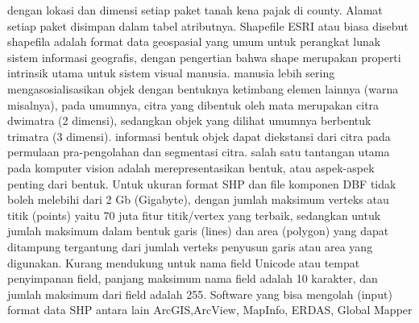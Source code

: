 dengan lokasi dan dimensi setiap paket tanah kena pajak di county. Alamat setiap paket disimpan dalam tabel atributnya.
Shapefile ESRI atau biasa disebut shapefila adalah format data geospasial yang umum untuk perangkat lunak sistem informasi geografis, dengan pengertian bahwa shape merupakan properti intrinsik utama untuk sistem visual manusia. manusia lebih sering mengasosialisasikan objek dengan bentuknya ketimbang elemen lainnya (warna misalnya), pada umumnya, citra yang dibentuk oleh mata merupakan citra dwimatra (2 dimensi), sedangkan objek yang dilihat umumnya berbentuk trimatra (3 dimensi). informasi bentuk objek dapat diekstansi dari citra pada permulaan pra-pengolahan dan segmentasi citra. salah satu tantangan utama pada komputer vision adalah merepresentasikan bentuk, atau aspek-aspek penting dari bentuk.
Untuk ukuran format SHP dan file komponen DBF tidak boleh melebihi dari 2 Gb (Gigabyte), 
dengan jumlah maksimum verteks atau titik (points) yaitu 70 juta fitur titik/vertex yang terbaik, 
sedangkan untuk jumlah maksimum dalam bentuk garis (lines) dan area (polygon) yang dapat ditampung tergantung dari jumlah verteks penyusun garis atau area yang digunakan. 
Kurang mendukung untuk nama field Unicode atau tempat penyimpanan field, panjang maksimum nama field adalah 10 karakter, 
dan jumlah maksimum dari field adalah 255.
Software yang bisa mengolah (input) format data SHP antara lain ArcGIS,ArcView, MapInfo, ERDAS, Global Mapper

